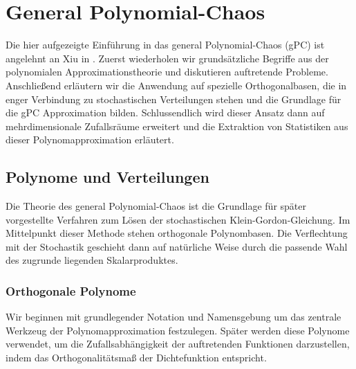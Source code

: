 
\chapter{General Polynomial-Chaos}
\label{Chapter3}
Die hier aufgezeigte Einführung in das general Polynomial-Chaos (gPC) ist angelehnt an Xiu in \autocite{dongbinxiu2010}. Zuerst wiederholen wir grundsätzliche Begriffe aus der polynomialen Approximationstheorie und diskutieren auftretende Probleme. Anschließend erläutern wir die Anwendung auf spezielle Orthogonalbasen, die in enger Verbindung zu stochastischen Verteilungen stehen und die Grundlage für die gPC Approximation bilden. Schlussendlich wird dieser Ansatz dann auf mehrdimensionale Zufallsräume erweitert und die Extraktion von Statistiken aus dieser Polynomapproximation erläutert.
\section{Polynome und Verteilungen}
Die Theorie des general Polynomial-Chaos ist die Grundlage für später vorgestellte Verfahren zum Lösen der stochastischen Klein-Gordon-Gleichung. Im Mittelpunkt dieser Methode stehen orthogonale Polynombasen. Die Verflechtung mit der Stochastik geschieht dann auf natürliche Weise durch die passende Wahl des zugrunde liegenden Skalarproduktes.
\subsection{Orthogonale Polynome}
Wir beginnen mit grundlegender Notation und Namensgebung um das zentrale Werkzeug der Polynomapproximation festzulegen. Später werden diese Polynome verwendet, um die Zufallsabhängigkeit der auftretenden Funktionen darzustellen, indem das Orthogonalitätsmaß der Dichtefunktion entspricht.

